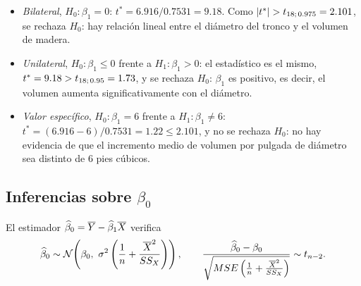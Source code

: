 \begin{ejemplo}
  \begin{itemize}
    \item \emph{Bilateral}, $H_0\colon\beta_1=0$:
      $t^* = 6.916/0.7531 = 9.18$. Como $|t^*|>\tq{18}{0.975}=2.101$, se rechaza $H_0$: hay
      relación lineal entre el diámetro del tronco y el volumen de madera.
    \item \emph{Unilateral}, $H_0\colon\beta_1\le0$ frente a $H_1\colon\beta_1>0$: el estadístico
      es el mismo, $t^*=9.18>t_{18;\,0.95}=1.73$, y se rechaza $H_0$: $\beta_1$ es positivo, es
      decir, el volumen aumenta significativamente con el diámetro.
    \item \emph{Valor específico}, $H_0\colon\beta_1=6$ frente a $H_1\colon\beta_1\neq6$:
      $t^* = (6.916-6)/0.7531 = 1.22 \le 2.101$, y no se rechaza $H_0$: no hay evidencia de que
      el incremento medio de volumen por pulgada de diámetro sea distinto de 6 pies cúbicos.
  \end{itemize}
\end{ejemplo}

\subsection{Inferencias sobre \texorpdfstring{$\beta_0$}{beta0}}

\begin{teorema}
  El estimador $\widehat{\beta}_0=\overline{Y}-\widehat{\beta}_1\overline{X}$ verifica
  \[
    \est{\beta}_0 \sim \Normal\!\left(\beta_0,\ \sigma^2\left(\frac1n+\frac{\media{X}^2}{\SSX}\right)\right),
    \qquad
    \frac{\est{\beta}_0-\beta_0}{\raizMSE{\frac1n+\frac{\media{X}^2}{\SSX}}} \sim \tdist{n-2}.
  \]
\end{teorema}

